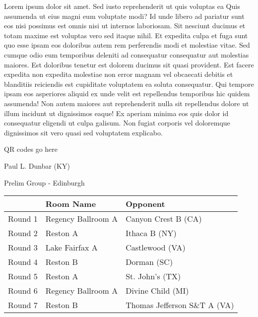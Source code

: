 \documentclass{article}%
\begin{document}
\vspace*{8pt}%
\linebreak%
\newline%
\newline%
Lorem ipsum dolor sit amet. Sed iusto reprehenderit ut quis voluptas ea Quis assumenda ut eius magni eum voluptate modi? Id unde libero ad pariatur sunt eos nisi possimus est omnis nisi ut internos laboriosam. Sit nesciunt ducimus et totam maxime est voluptas vero sed itaque nihil. Et expedita culpa et fuga sunt quo esse ipsam eos doloribus autem rem perferendis modi et molestiae vitae.\newline%
\newline%
Sed cumque odio eum temporibus deleniti ad consequatur consequatur aut molestias maiores. Est doloribus tenetur est dolorem ducimus sit quasi provident. Est facere expedita non expedita molestiae non error magnam vel obcaecati debitis et blanditiis reiciendis est cupiditate voluptatem ea soluta consequatur. Qui tempore ipsam eos asperiores aliquid ex unde velit est repellendus temporibus hic quidem assumenda!\newline%
\newline%
Non autem maiores aut reprehenderit nulla sit repellendus dolore ut illum incidunt ut dignissimos eaque! Ex aperiam minima eos quis dolor id consequatur eligendi ut culpa galisum. Non fugiat corporis vel doloremque dignissimos sit vero quasi sed voluptatem explicabo.\newline%
\newline%
%
\vspace*{30pt}%
\begin{center}%
\begin{Huge}%
QR codes go here%
\end{Huge}%
\end{center}%
\newpage%
%
\begin{center}%
\begin{Huge}%
Paul L. Dunbar (KY)%
\end{Huge}%
\vspace*{8pt}%
\linebreak%
\begin{Large}%
Prelim Group {-} Edinburgh%
\end{Large}%
\end{center}%
\begin{tabularx}{\textwidth}{|c|Y|Y|}%
\hline%
&Room Name&Opponent\\%
\hline%
Round 1&Regency Ballroom A&Canyon Crest B (CA)\\%
Round 2&Reston A&Ithaca B (NY)\\%
Round 3&Lake Fairfax A&Castlewood (VA)\\%
Round 4&Reston B&Dorman (SC)\\%
Round 5&Reston A&St. John's (TX)\\%
Round 6&Regency Ballroom A&Divine Child (MI)\\%
Round 7&Reston B&Thomas Jefferson S\&T A (VA)\\%
\hline%
\end{tabularx}%
\end{document}
